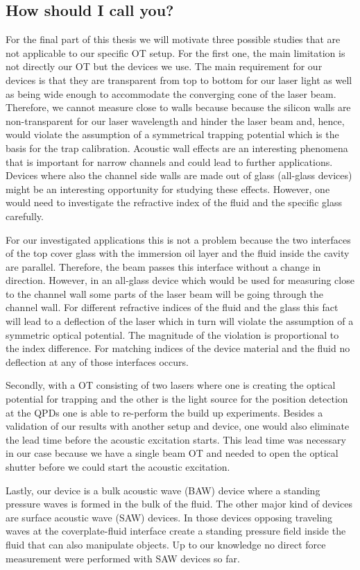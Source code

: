 \subsection{How should I call you?}

For the final part of this thesis we will motivate three possible studies that 
are not applicable to our specific OT setup. For the first one, the main 
limitation is not directly our OT but the devices we use. The main requirement 
for our devices is that they are transparent from top to bottom for our laser 
light as well as being wide enough to accommodate the converging cone of the 
laser beam.  Therefore, we cannot measure close to walls because because the 
silicon walls are non-transparent for our laser wavelength and hinder the laser 
beam and, hence, would violate the assumption of a symmetrical trapping 
potential which is the basis for the trap calibration. Acoustic wall effects 
are an interesting phenomena that is important for narrow channels and could 
lead to further applications. Devices where also the channel side walls are 
made out of glass (all-glass devices) might be an interesting opportunity for 
studying these effects. However, one would need to investigate the refractive 
index of the fluid and the specific glass carefully.

For our investigated applications this is not a problem because the two 
interfaces of the top cover glass with the immersion oil layer and the fluid 
inside the cavity are parallel. Therefore, the beam passes this interface 
without a change in direction. However, in an all-glass device which would be 
used for measuring close to the channel wall some parts of the laser beam will 
be going through the channel wall. For different refractive indices of the 
fluid and the glass this fact will lead to a deflection of the laser which in 
turn will violate the assumption of a symmetric optical potential. The 
magnitude of the violation is proportional to the index difference. For 
matching indices of the device material and the fluid no deflection at any of 
those interfaces occurs.

Secondly, with a OT consisting of two lasers where one is creating the optical 
potential for trapping and the other is the light source for the position 
detection at the QPDs one is able to re-perform the build up experiments.  
Besides a validation of our results with another setup and device, one would 
also eliminate the lead time before the acoustic excitation starts. This lead 
time was necessary in our case because we have a single beam OT and needed to 
open the optical shutter before we could start the acoustic excitation.

Lastly, our device is a bulk acoustic wave (BAW) device where a standing 
pressure waves is formed in the bulk of the fluid. The other major kind of 
devices are surface acoustic wave (SAW) devices. In those devices opposing 
traveling waves at the coverplate-fluid interface create a standing pressure 
field inside the fluid that can also manipulate objects. Up to our knowledge no 
direct force measurement were performed with SAW devices so far.
